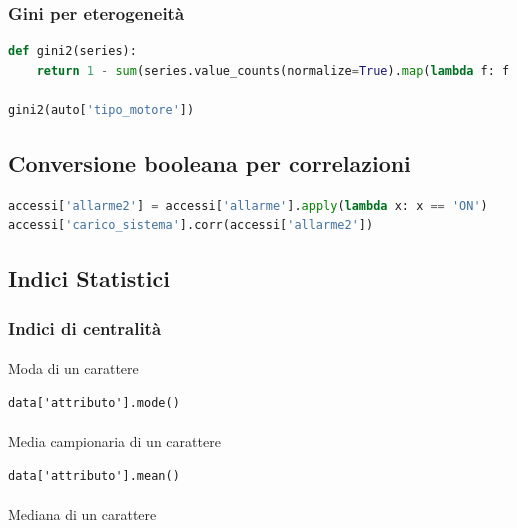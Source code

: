 \documentclass{article}
\begin{document}
\subsubsection*{Gini per eterogeneità}
\begin{lstlisting}[language=Python]
def gini2(series):
    return 1 - sum(series.value_counts(normalize=True).map(lambda f: f ** 2))

gini2(auto['tipo_motore'])
\end{lstlisting}

\subsection*{Conversione booleana per correlazioni}

\begin{lstlisting}[language=Python]
accessi['allarme2'] = accessi['allarme'].apply(lambda x: x == 'ON')
accessi['carico_sistema'].corr(accessi['allarme2'])
\end{lstlisting}

\subsection*{Indici Statistici}

\subsubsection*{Indici di centralità}

\paragraph{}{Moda di un carattere}


\begin{lstlisting}
data['attributo'].mode()
\end{lstlisting}

\paragraph{}{Media campionaria di un carattere}

\begin{lstlisting}
data['attributo'].mean()
\end{lstlisting}

\paragraph{}{Mediana di un carattere}
\end{document}
